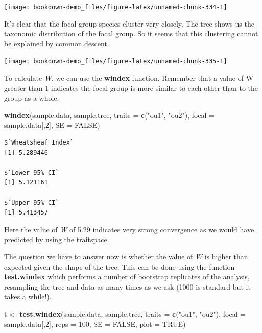 \documentclass[
]{book}
\newenvironment{Shaded}{\begin{snugshade}}{\end{snugshade}}
\newcommand{\DataTypeTok}[1]{\textcolor[rgb]{0.13,0.29,0.53}{#1}}
\newcommand{\DecValTok}[1]{\textcolor[rgb]{0.00,0.00,0.81}{#1}}
\newcommand{\KeywordTok}[1]{\textcolor[rgb]{0.13,0.29,0.53}{\textbf{#1}}}
\newcommand{\NormalTok}[1]{#1}
\newcommand{\OtherTok}[1]{\textcolor[rgb]{0.56,0.35,0.01}{#1}}
\newcommand{\StringTok}[1]{\textcolor[rgb]{0.31,0.60,0.02}{#1}}
\begin{document}
\begin{center}\texttt{[image: bookdown-demo\_files/figure-latex/unnamed-chunk-334-1]} \end{center}

It's clear that the focal group species cluster very closely. The tree shows us the taxonomic distribution of the focal group. So it seems that this clustering cannot be explained by common descent.

\begin{center}\texttt{[image: bookdown-demo\_files/figure-latex/unnamed-chunk-335-1]} \end{center}

To calculate \emph{W}, we can use the \textbf{windex} function. Remember that a value of W greater than 1 indicates the focal group is more similar to each other than to the group as a whole.

\begin{Shaded}
\begin{Highlighting}[]
\KeywordTok{windex}\NormalTok{(sample.data, sample.tree,}
       \DataTypeTok{traits =} \KeywordTok{c}\NormalTok{(}\StringTok{"ou1"}\NormalTok{, }\StringTok{"ou2"}\NormalTok{),}
       \DataTypeTok{focal =}\NormalTok{ sample.data[,}\DecValTok{2}\NormalTok{],}
       \DataTypeTok{SE =} \OtherTok{FALSE}\NormalTok{)}
\end{Highlighting}
\end{Shaded}

\begin{verbatim}
$`Wheatsheaf Index`
[1] 5.289446

$`Lower 95% CI`
[1] 5.121161

$`Upper 95% CI`
[1] 5.413457
\end{verbatim}

Here the value of \emph{W} of 5.29 indicates very strong convergence as we would have predicted by using the traitspace.

The question we have to answer now is whether the value of \emph{W} is higher than expected given the shape of the tree. This can be done using the function \textbf{test.windex} which performs a number of bootstrap replicates of the analysis, resampling the tree and data as many times as we ask (1000 is standard but it takes a while!).

\begin{Shaded}
\begin{Highlighting}[]
\NormalTok{t \textless{}{-}}\StringTok{ }\KeywordTok{test.windex}\NormalTok{(sample.data, sample.tree,}
       \DataTypeTok{traits =} \KeywordTok{c}\NormalTok{(}\StringTok{"ou1"}\NormalTok{, }\StringTok{"ou2"}\NormalTok{),}
       \DataTypeTok{focal =}\NormalTok{ sample.data[,}\DecValTok{2}\NormalTok{], }\DataTypeTok{reps =} \DecValTok{100}\NormalTok{,}
       \DataTypeTok{SE =} \OtherTok{FALSE}\NormalTok{, }\DataTypeTok{plot =} \OtherTok{TRUE}\NormalTok{)}
\end{Highlighting}
\end{Shaded}
\end{document}
